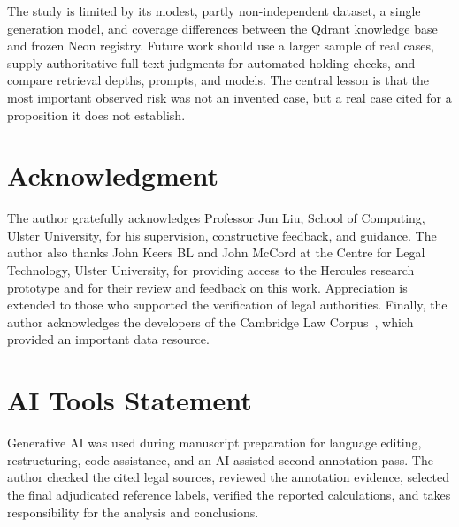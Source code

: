 \documentclass[conference]{IEEEtran}
\begin{document}
The study is limited by its modest, partly non-independent dataset, a single generation model, and coverage differences between the Qdrant knowledge base and frozen Neon registry. Future work should use a larger sample of real cases, supply authoritative full-text judgments for automated holding checks, and compare retrieval depths, prompts, and models. The central lesson is that the most important observed risk was not an invented case, but a real case cited for a proposition it does not establish.

\section*{Acknowledgment}

The author gratefully acknowledges Professor Jun Liu, School of Computing, Ulster University, for his supervision, constructive feedback, and guidance. The author also thanks John Keers BL and John McCord at the Centre for Legal Technology, Ulster University, for providing access to the Hercules research prototype and for their review and feedback on this work. Appreciation is extended to those who supported the verification of legal authorities. Finally, the author acknowledges the developers of the Cambridge Law Corpus~\cite{cambridge2023}, which provided an important data resource.

\section*{AI Tools Statement}

Generative AI was used during manuscript preparation for language editing, restructuring, code assistance, and an AI-assisted second annotation pass. The author checked the cited legal sources, reviewed the annotation evidence, selected the final adjudicated reference labels, verified the reported calculations, and takes responsibility for the analysis and conclusions.
\end{document}
